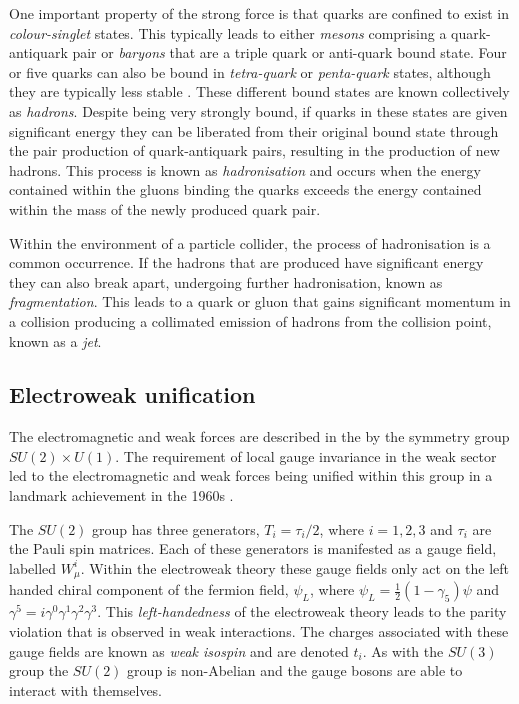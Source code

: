 One important property of the strong force is that quarks are confined
to exist in \emph{colour-singlet} states. This typically leads to
either \emph{mesons} comprising a quark-antiquark pair or
\emph{baryons} that are a triple quark or anti-quark bound state. Four
or five quarks can also be bound in \emph{tetra-quark} or \emph{penta-quark} states,
although they are typically less stable \cite{Olive:2016xmw,Aaij:2015tga}. These different bound states
are known collectively as \emph{hadrons}. Despite being very strongly
bound, if quarks in these states are given significant energy they can
be liberated from their original bound state through the pair
production of quark-antiquark pairs, resulting in the production of
new hadrons. This process is known as \emph{hadronisation} and occurs
when the energy contained within the gluons binding the quarks exceeds
the energy contained within the mass of the newly produced quark pair. 

Within
the environment of a particle collider, the process of hadronisation
is a common occurrence. 
If the hadrons that are produced have
significant energy they can also break apart, undergoing further
hadronisation, known as \emph{fragmentation}. This
leads to a quark or gluon that gains significant momentum in a
collision producing a collimated emission of hadrons from
the collision point, known as a \emph{jet}.

\subsection{Electroweak unification}

The electromagnetic and weak forces are described in the \SM by the
symmetry group $SU(2)\times U(1)$. The requirement of local gauge
invariance in the weak sector led to the electromagnetic and weak
forces being unified within this group in a landmark achievement in
the 1960s \cite{Glashow:1961tr,PhysRevLett.19.1264,Salam:1964ry}.

The $SU(2)$ group has three generators, $T_i=\tau_i/2$, where
$i=1,2,3$ and $\tau_i$ are the Pauli spin matrices. Each of these generators is manifested
as a gauge field, labelled $W_{\mu}^i$. Within the electroweak theory
these gauge fields only act on the left handed chiral component of the
fermion field, $\psi_L$, where $\psi_L = \frac{1}{2}(1-\gamma_5)\psi$ and
$\gamma^5=i\gamma^0\gamma^1\gamma^2\gamma^3$. This 
\emph{left-handedness} of the electroweak theory leads to the parity violation
that is observed in weak interactions. The charges associated with
these gauge fields are known as \emph{weak isospin} and are denoted
$t_i$. As with the $SU(3)$ group the $SU(2)$ group is non-Abelian and
the gauge bosons are able to interact with themselves.

